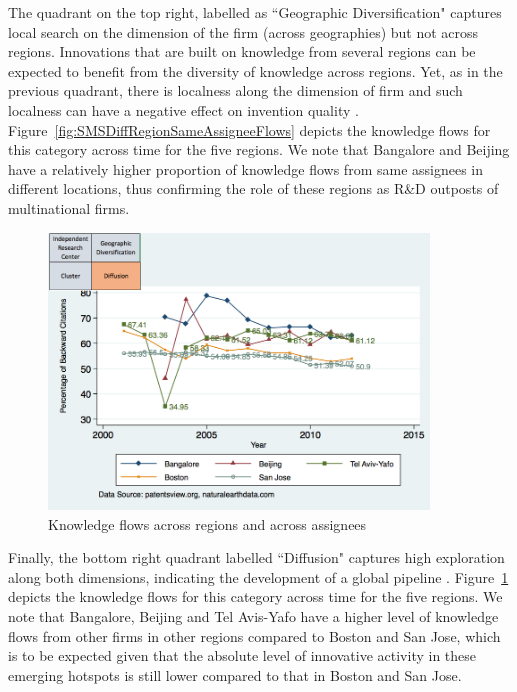 \documentclass[12pt,letterpaper]{article}
\begin{document}
The quadrant on the top right, labelled as ``Geographic Diversification" captures local search on the dimension of the firm (across geographies) but not across regions. Innovations that are built on knowledge from several regions can be expected to benefit from the diversity of knowledge across regions. Yet, as in the previous quadrant, there is localness along the dimension of firm and such localness can have a negative effect on invention quality \citep{Rosenkopf2001}. Figure~\ref{fig:SMSDiffRegionSameAssigneeFlows} depicts the  knowledge flows for this category across time for the five regions. We note that Bangalore and Beijing have a relatively higher proportion of knowledge flows from same assignees in different locations, thus confirming the role of these regions as R\&D outposts of multinational firms.\par

\begin{figure}[h!]
\begin{centering}
  \includegraphics[width=0.90\textwidth]{SMSDiffRegionDiffAssigneeFlows}
  \caption{Knowledge flows across regions and across assignees}
  \label{fig:SMSDiffRegionDiffAssigneeFlows}
\end{centering}
\end{figure}

Finally, the bottom right quadrant labelled ``Diffusion" captures high exploration along both dimensions, indicating the development of a global pipeline \citep*{Bathelt2004}. Figure~\ref{fig:SMSDiffRegionDiffAssigneeFlows} depicts the  knowledge flows for this category across time for the five regions. We note that Bangalore, Beijing and Tel Avis-Yafo have a higher level of knowledge flows from other firms in other regions compared to Boston and San Jose, which is to be expected given that the absolute level of innovative activity in these emerging hotspots is still lower compared to that in Boston and San Jose. \par
\end{document}
